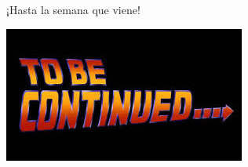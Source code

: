 \documentclass[compress]{beamer}
\begin{document}
\begin{frame}{¡Hasta la semana que viene!}
\begin{center}
\includegraphics[scale=0.7]{images/to_be_continued.jpg}
\end{center}
\end{frame}
\end{document}
